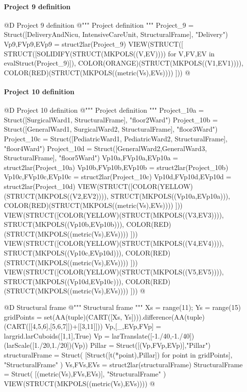 \documentclass[11pt,oneside]{article}    %
\begin{document}
\paragraph{Project 9 definition}
@D Project 9 definition
@{""" Project definition """
Project_9 = Struct([DeliveryAndNicu, IntensiveCareUnit, StructuralFrame], "Delivery")
Vp9,FVp9,EVp9 = struct2lar(Project_9)
VIEW(STRUCT([ STRUCT([SOLIDIFY(STRUCT(MKPOLS((V,EV)))) for V,FV,EV in evalStruct(Project_9)]), 
	COLOR(ORANGE)(STRUCT(MKPOLS((V1,EV1)))), COLOR(RED)(STRUCT(MKPOLS((metric(Vs),EVs)))) ]))
@}


\paragraph{Project 10 definition}
@D Project 10 definition
@{""" Project definition """
Project_10a = Struct([SurgicalWard1, StructuralFrame], "floor2Ward")
Project_10b = Struct([GeneralWard1, SurgicalWard2, StructuralFrame], "floor3Ward")
Project_10c = Struct([PediatricWard1, PediatricWard2, StructuralFrame], "floor4Ward")
Project_10d = Struct([GeneralWard2,GeneralWard3, StructuralFrame], "floor5Ward")
Vp10a,FVp10a,EVp10a = struct2lar(Project_10a)
Vp10b,FVp10b,EVp10b = struct2lar(Project_10b)
Vp10c,FVp10c,EVp10c = struct2lar(Project_10c)
Vp10d,FVp10d,EVp10d = struct2lar(Project_10d)
VIEW(STRUCT([COLOR(YELLOW)(STRUCT(MKPOLS((V2,EV2)))), STRUCT(MKPOLS((Vp10a,EVp10a))),
COLOR(RED)(STRUCT(MKPOLS((metric(Vs),EVs)))) ]))
VIEW(STRUCT([COLOR(YELLOW)(STRUCT(MKPOLS((V3,EV3)))), STRUCT(MKPOLS((Vp10b,EVp10b))),
COLOR(RED)(STRUCT(MKPOLS((metric(Vs),EVs)))) ]))
VIEW(STRUCT([COLOR(YELLOW)(STRUCT(MKPOLS((V4,EV4)))), STRUCT(MKPOLS((Vp10c,EVp10d))),
COLOR(RED)(STRUCT(MKPOLS((metric(Vs),EVs)))) ]))
VIEW(STRUCT([COLOR(YELLOW)(STRUCT(MKPOLS((V5,EV5)))), STRUCT(MKPOLS((Vp10d,EVp10c))),
COLOR(RED)(STRUCT(MKPOLS((metric(Vs),EVs)))) ]))
@}


@D Structural frame
@{""" Structural frame """
Xs = range(11); Ys = range(15)
gridPoints = set(AA(tuple)(CART([Xs, Ys]))).difference(AA(tuple)(CART([[4,5,6],[5,6,7]])+[[3,11]]))
Vp,[_,EVp,FVp] = largrid.larCuboids([1,1],True)
Vp = larTranslate([-1./40,-1./40])(larScale([1./20,1./20])(Vp))
Pillar = Struct([(Vp,FVp,EVp)],"Pillar")
structuralFrame = Struct( [Struct([t(*point),Pillar]) for point in gridPoints], "StructuralFrame" )
Vs,FVs,EVs = struct2lar(structuralFrame)
StructuralFrame = Struct( [(metric(Vs),FVs,EVs)], "StructuralFrame" )
VIEW(STRUCT(MKPOLS((metric(Vs),EVs))))
@}
\end{document}
